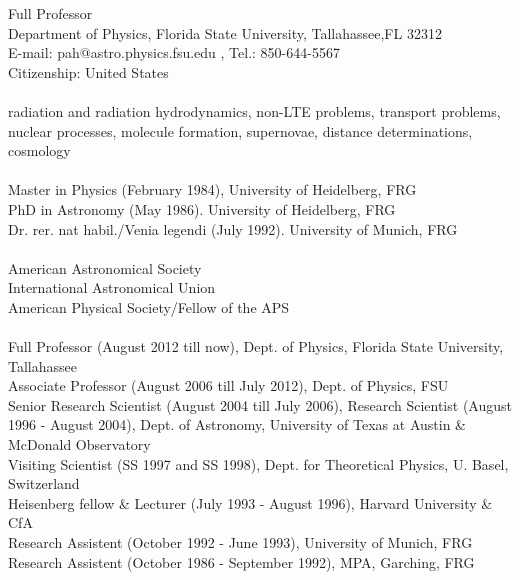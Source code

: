 

 Full Professor                                                                \\
 Department of Physics, Florida State University, Tallahassee,FL 32312         \\
 E-mail: pah@astro.physics.fsu.edu , Tel.: 850-644-5567                       \\
 Citizenship: United States                                                   \\



                                                              \\  
 radiation and radiation hydrodynamics,  non-LTE problems, transport problems,                    \\  
 nuclear processes,  molecule formation, supernovae, distance determinations, cosmology                \\  

                                                                                                              
        \\  
 Master in Physics (February 1984), University of Heidelberg, FRG     \\  
 PhD in Astronomy (May 1986). University of Heidelberg, FRG                \\  
 Dr. rer. nat habil./Venia legendi (July 1992). University of Munich, FRG       \\  


    \\
 American Astronomical Society                      \\
 International Astronomical Union                     \\
 American Physical Society/Fellow of the APS           \\

        \\
\noindent
 Full Professor  (August 2012 till now),                
 Dept. of Physics, Florida State University, Tallahassee \\
 Associate Professor  (August 2006 till July 2012),
 Dept. of Physics, FSU   \\
 Senior Research  Scientist (August 2004 till July 2006), Research  Scientist (August 1996 - August 2004),
Dept. of Astronomy, University of Texas at Austin \& McDonald Observatory   \\
 Visiting Scientist (SS 1997 and SS 1998), Dept. for Theoretical Physics, U. Basel, Switzerland  \\
  Heisenberg fellow \& Lecturer (July 1993 - August 1996),
Harvard University \& CfA    \\
 Research Assistent (October 1992 - June 1993), University of Munich, FRG   \\
 Research Assistent (October 1986 - September 1992), MPA, Garching, FRG       \\

